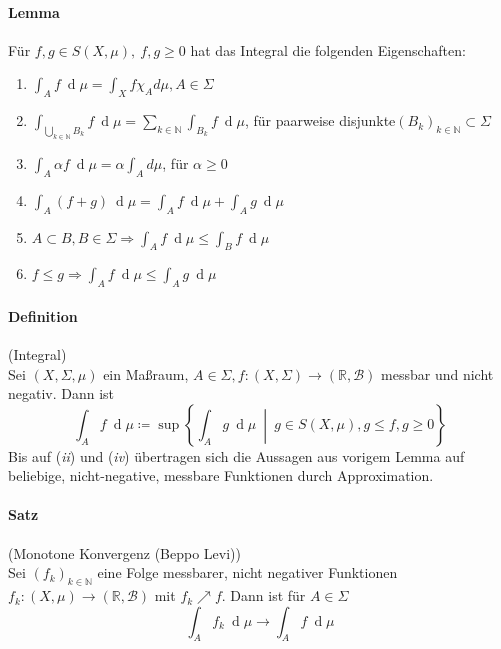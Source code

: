 \documentclass[12pt,a4paper,fleqn]{article}
\def\set#1{{\left\{ #1 \right\}}}
\def\Mid{\ \middle|\ }
\def\d{{\operatorname{d}}}
\begin{document}
\paragraph{Lemma} Für $f, g \in S(X, \mu),\ f, g \geq 0$ hat das Integral die folgenden Eigenschaften:
\begin{enumerate}
\item$\int_A f\ \d\mu = \int_X f \chi_A d\mu, A \in \Sigma$
\item$\int_{\bigcup_{k \in \mathbb{N}}B_k}f\ \d\mu = \sum_{k \in \mathbb{N}} \int_{B_k} f\ \d\mu$, für paarweise disjunkte$(B_k)_{k \in \mathbb{N}} \subset \Sigma$
\item$\int_A \alpha f\ \d\mu = \alpha \int_A d\mu$, für $\alpha \geq 0$
\item$\int_A (f + g)\ \d\mu = \int_A f\ \d\mu + \int_A g\ \d\mu$
\item$A \subset B, B \in \Sigma \Rightarrow \int_A f\ \d\mu \leq \int_B f\ \d\mu$
\item$f \leq g \Rightarrow \int_A f\ \d\mu \leq \int_A g\ \d\mu$
\end{enumerate}

\paragraph{Definition} (Integral)\\
Sei $(X, \Sigma, \mu)$ ein Maßraum, $A \in \Sigma, f\colon (X, \Sigma) \rightarrow (\mathbb{R}, \mathcal{B})$ messbar und nicht negativ. Dann ist 
\begin{displaymath}
\int_A f\ \d\mu \coloneqq \sup \set{\int_A g\ \d\mu \Mid g \in S(X, \mu), g \leq f, g \geq 0 }
\end{displaymath}
Bis auf (\textit{ii}) und (\textit{iv}) übertragen sich die Aussagen aus vorigem Lemma auf beliebige, nicht-negative, messbare Funktionen durch Approximation.

\paragraph{Satz} (Monotone Konvergenz (Beppo Levi))\\
Sei $(f_k)_{k \in \mathbb{N}}$ eine Folge messbarer, nicht negativer Funktionen $f_k: (X, \mu) \rightarrow (\mathbb{R}, \mathcal{B})$ mit $f_k \nearrow f$. Dann ist für $A \in \Sigma$
\begin{displaymath}
\int_A f_k\ \d\mu \rightarrow \int_A f\ \d\mu 
\end{displaymath}
\end{document}
